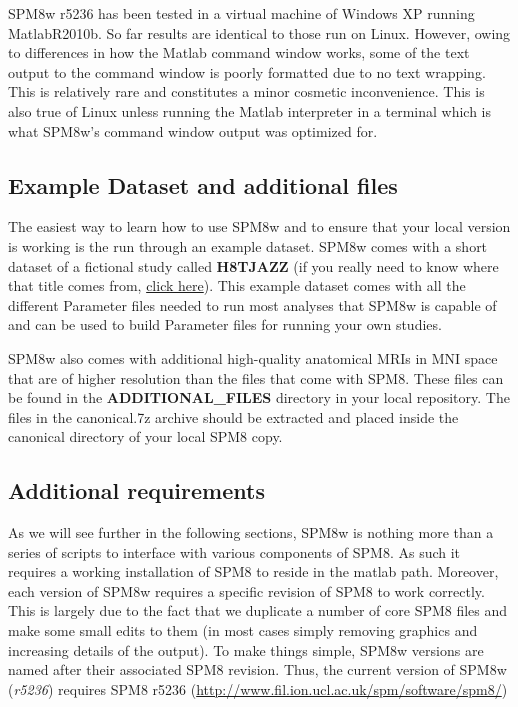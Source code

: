 \documentclass[12pt]{article}
\begin{document}
SPM8w r5236 has been tested in a virtual machine of Windows XP running MatlabR2010b. So far results are identical to those run on Linux. However, owing to differences in how the Matlab command window works, some of the text output to the command window is poorly formatted due to no text wrapping. This is relatively rare and constitutes a minor cosmetic inconvenience. This is also true of Linux unless running the Matlab interpreter in a terminal which is what SPM8w's command window output was optimized for. 

\subsection{Example Dataset and additional files}
The easiest way to learn how to use SPM8w and to ensure that your local version is working is the run through an example dataset. SPM8w comes with a short dataset of a fictional study called \textbf{H8TJAZZ} (if you really need to know where that title comes from, \href{http://www.youtube.com/watch?v=bKwQ_zeRwEs}{click here}). This example dataset comes with all the different Parameter files needed to run most analyses that SPM8w is capable of and can be used to build Parameter files for running your own studies.

SPM8w also comes with additional high-quality anatomical MRIs in MNI space that are of higher resolution than the files that come with SPM8. These files can be found in the \textbf{ADDITIONAL\_FILES} directory in your local repository. The files in the canonical.7z archive should be extracted and placed inside the canonical directory of your local SPM8 copy. 

\subsection{Additional requirements}
As we will see further in the following sections, SPM8w is nothing more than a series of scripts to interface with various components of SPM8. As such it requires a working installation of SPM8 to reside in the matlab path. Moreover, each version of SPM8w requires a specific revision of SPM8 to work correctly. This is largely due to the fact that we duplicate a number of core SPM8 files and make some small edits to them (in most cases simply removing graphics and increasing details of the output). To make things simple, SPM8w versions are named after their associated SPM8 revision. Thus, the current version of SPM8w (\emph{r5236}) requires SPM8 r5236 (\url{http://www.fil.ion.ucl.ac.uk/spm/software/spm8/})
\end{document}
